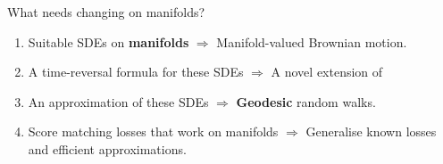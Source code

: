    \begin{frame}{What needs changing on manifolds?}
   
   \begin{enumerate}
       \item Suitable SDEs on \textbf{manifolds} $\Rightarrow$ %
       Manifold-valued Brownian motion.
       \item A time-reversal formula for these SDEs $\Rightarrow$ A novel extension of \textcite{cattiaux2021time}%
       \pause
       \item An approximation of these SDEs $\Rightarrow$ \textbf{Geodesic} random walks.
       \pause
       \item Score matching losses that work on manifolds $\Rightarrow$
       Generalise known losses and efficient approximations.
   \end{enumerate}
   
       
   \end{frame}
   

